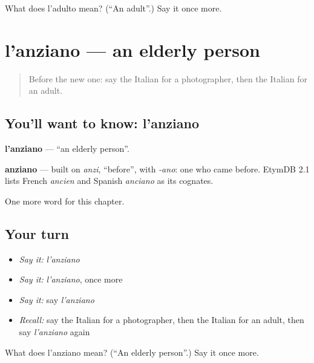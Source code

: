 \begin{tcolorbox}[breakable,colback=teal!4,colframe=teal!35!black,title={Before you move on}]
What does l'adulto mean? (\textquotedblleft{}An adult\textquotedblright{}.) Say it once more.
\end{tcolorbox}
\section[l'anziano]{l'anziano — an elderly person}

\label{lesson:IT-C224-anziano}



\begin{quote}
Before the new one: say the Italian for a photographer, then the Italian for an adult.
\end{quote}

\subsection*{You'll want to know: l'anziano}
\textbf{l'anziano} — \textquotedblleft{}an elderly person\textquotedblright{}.

\begin{cousinweb}
\textbf{anziano} — built on \emph{anzi}, \textquotedblleft{}before\textquotedblright{}, with \emph{-ano}: one who came before. EtymDB 2.1 lists French \emph{ancien} and Spanish \emph{anciano} as its cognates.
\end{cousinweb}

\begin{grammarlens}[title={What you've built}]
One more word for this chapter.
\end{grammarlens}

\subsection*{Your turn}
\begin{itemize}
\raggedright
  \item \emph{Say it:} \emph{l'anziano}
  \item \emph{Say it:} \emph{l'anziano}, once more
  \item \emph{Say it:} say \emph{l'anziano}
  \item \emph{Recall:} say the Italian for a photographer, then the Italian for an adult, then say \emph{l'anziano} again
\end{itemize}

\begin{tcolorbox}[breakable,colback=teal!4,colframe=teal!35!black,title={Before you move on}]
What does l'anziano mean? (\textquotedblleft{}An elderly person\textquotedblright{}.) Say it once more.
\end{tcolorbox}
